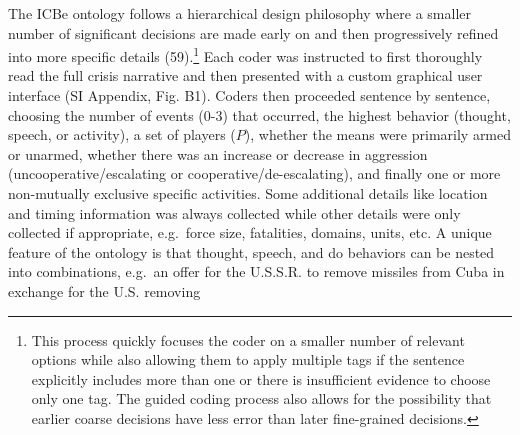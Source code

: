 \documentclass[9pt,twocolumn,twoside,lineno]{pnas-new}
\renewcommand{\arraystretch}{0.8}
\begin{document}
The ICBe ontology follows a hierarchical design philosophy where a
smaller number of significant decisions are made early on and then
progressively refined into more specific details (59).\footnote{This
  process quickly focuses the coder on a smaller number of relevant
  options while also allowing them to apply multiple tags if the
  sentence explicitly includes more than one or there is insufficient
  evidence to choose only one tag. The guided coding process also allows
  for the possibility that earlier coarse decisions have less error than
  later fine-grained decisions.} Each coder was instructed to first
thoroughly read the full crisis narrative and then presented with a
custom graphical user interface (SI Appendix, Fig. B1). Coders then
proceeded sentence by sentence, choosing the number of events (0-3) that
occurred, the highest behavior (thought, speech, or activity), a set of
players (\(P\)), whether the means were primarily armed or unarmed,
whether there was an increase or decrease in aggression
(uncooperative/escalating or cooperative/de-escalating), and finally one
or more non-mutually exclusive specific activities. Some additional
details like location and timing information was always collected while
other details were only collected if appropriate, e.g.~force size,
fatalities, domains, units, etc. A unique feature of the ontology is
that thought, speech, and do behaviors can be nested into combinations,
e.g.~an offer for the U.S.S.R. to remove missiles from Cuba in exchange for the U.S. removing \linebreak \clearpage
\onecolumn


\providecommand{\docline}[3]{\noalign{\global\setlength{\arrayrulewidth}{#1}}\arrayrulecolor[HTML]{#2}\cline{#3}}

\setlength{\tabcolsep}{2pt}

\renewcommand*{\arraystretch}{0.75}
\end{document}
